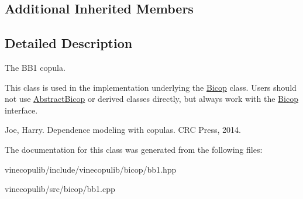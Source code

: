 \subsection*{Additional Inherited Members}


\subsection{Detailed Description}
The B\+B1 copula. 

This class is used in the implementation underlying the \hyperlink{classvinecopulib_1_1_bicop}{Bicop} class. Users should not use \hyperlink{classvinecopulib_1_1_abstract_bicop}{Abstract\+Bicop} or derived classes directly, but always work with the \hyperlink{classvinecopulib_1_1_bicop}{Bicop} interface.

Joe, Harry. Dependence modeling with copulas. C\+R\+C Press, 2014. 

The documentation for this class was generated from the following files\+:\begin{DoxyCompactItemize}
\item 
vinecopulib/include/vinecopulib/bicop/bb1.\+hpp\item 
vinecopulib/src/bicop/bb1.\+cpp\end{DoxyCompactItemize}
